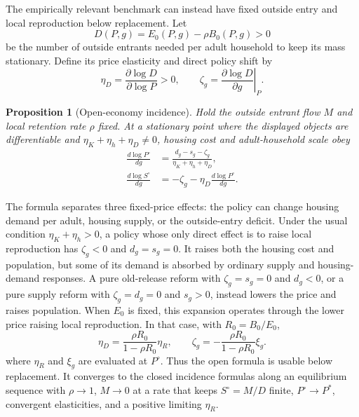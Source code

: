 \documentclass[11pt]{article}
\newtheorem{proposition}{Proposition}
\theoremstyle{definition}
\newcommand{\1}{\mathbf 1}
\begin{document}
The empirically relevant benchmark can instead have fixed outside entry and
local reproduction below replacement. Let
\begin{equation}
 D(P,g)=E_0(P,g)-\rho B_0(P,g)>0
 \label{eq:open_deficit}
\end{equation}
be the number of outside entrants needed per adult household to keep its mass
stationary. Define its price elasticity and direct policy shift by
\begin{equation}
 \eta_D=\frac{\partial\log D}{\partial\log P}>0,
 \qquad
 \zeta_g=\left.\frac{\partial\log D}{\partial g}\right|_P.
 \label{eq:open_deficit_statistics}
\end{equation}

\begin{proposition}[Open-economy incidence]
\label{prop:open_incidence}
Hold the outside entrant flow $M$ and local retention rate $\rho$ fixed. At a
stationary point where the displayed objects are differentiable and
$\eta_K+\eta_h+\eta_D\neq0$, housing cost and adult-household scale obey
\begin{align}
 \frac{d\log P^\circ}{dg}
 &=\frac{d_g-s_g-\zeta_g}
 {\eta_K+\eta_h+\eta_D},
 \label{eq:open_price_incidence}\\
 \frac{d\log S^\circ}{dg}
 &=-\zeta_g-\eta_D\frac{d\log P^\circ}{dg}.
 \label{eq:open_scale_incidence}
\end{align}
\end{proposition}

The formula separates three fixed-price effects: the policy can change housing
demand per adult, housing supply, or the outside-entry deficit. Under the usual
condition $\eta_K+\eta_h>0$, a policy whose only direct effect is to raise local
reproduction has $\zeta_g<0$ and $d_g=s_g=0$. It raises both the housing cost
and population, but some of its demand is absorbed by ordinary supply and
housing-demand responses. A pure old-release reform with
$\zeta_g=s_g=0$ and $d_g<0$, or a pure supply reform with
$\zeta_g=d_g=0$ and $s_g>0$, instead lowers the price and raises population.
When $E_0$ is fixed, this expansion operates through the lower price raising
local reproduction. In that case, with $R_0=B_0/E_0$,
\begin{equation}
 \eta_D=\frac{\rho R_0}{1-\rho R_0}\eta_R,
 \qquad
 \zeta_g=-\frac{\rho R_0}{1-\rho R_0}\xi_g.
 \label{eq:open_closed_bridge}
\end{equation}
where $\eta_R$ and $\xi_g$ are evaluated at $P^\circ$. Thus the open formula is
usable below replacement. It converges to the closed incidence formulas along
an equilibrium sequence with $\rho\to1$, $M\to0$ at a rate that keeps
$S^\circ=M/D$ finite, $P^\circ\to P^*$, convergent elasticities, and a positive
limiting $\eta_R$.
\end{document}
